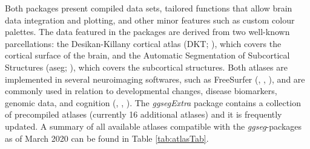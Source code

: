 \documentclass[fleqn,10pt]{wlpeerj} %
\begin{document}
Both packages present compiled data sets, tailored functions that allow brain data integration and plotting, and other minor features such as custom colour palettes.
The data featured in the packages are derived from two well-known parcellations: the Desikan-Killany cortical atlas (DKT; \citet{dkt}), which covers the cortical surface of the brain, and the Automatic Segmentation of Subcortical Structures (aseg; \citet{aseg}), which covers the subcortical structures.
Both atlases are implemented in several neuroimaging softwares, such as FreeSurfer (\citet{fischl_99}, \citet{dale_99}, \citet{Fischl2000}), and are commonly used in relation to developmental changes, disease biomarkers, genomic data, and cognition (\citet{amlien_elaboration_2019}, \citet{WALHOVD20051261}, \citet{Pizzagalli}).
The \emph{ggsegExtra} package contains a collection of precompiled atlases (currently 16 additional atlases) and it is frequently updated.
A summary of all available atlases compatible with the \emph{ggseg}-packages as of March 2020 can be found in Table \ref{tab:atlasTab}.
\end{document}
